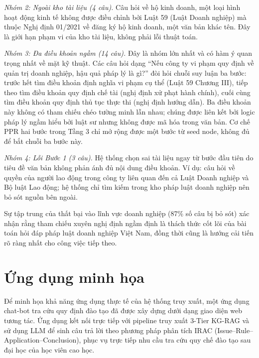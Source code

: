 \textit{Nhóm 2: Ngoài kho tài liệu (4 câu).} Câu hỏi về hộ kinh doanh, một loại hình
hoạt động kinh tế không được điều chỉnh bởi Luật 59 (Luật Doanh nghiệp) mà thuộc
Nghị định 01/2021 về đăng ký hộ kinh doanh, một văn bản khác tên. Đây là giới hạn
phạm vi của kho tài liệu, không phải lỗi thuật toán.

\textit{Nhóm 3: Đa điều khoản ngầm (14 câu).} Đây là nhóm lớn nhất và có hàm ý
quan trọng nhất về mặt kỹ thuật. Các câu hỏi dạng ``Nếu công ty vi phạm quy định về
quản trị doanh nghiệp, hậu quả pháp lý là gì?'' đòi hỏi chuỗi suy luận ba bước: trước hết tìm
điều khoản định nghĩa vi phạm cụ thể (Luật 59 Chương III), tiếp theo tìm điều khoản quy định
chế tài (nghị định xử phạt hành chính), cuối cùng tìm điều khoản quy định thủ tục thực thi
(nghị định hướng dẫn). Ba điều khoản này không có tham chiếu chéo tường minh lẫn
nhau; chúng được liên kết bởi logic pháp lý ngầm hiểu bởi luật sư nhưng không
được mã hóa trong văn bản. Cơ chế PPR hai bước trong Tầng 3 chỉ mở rộng được một
bước từ seed node, không đủ để bắt chuỗi ba bước này.

\textit{Nhóm 4: Lỗi Bước 1 (3 câu).} Hệ thống chọn sai tài liệu ngay từ bước đầu tiên
do tiêu đề văn bản không phản ánh đủ nội dung điều khoản. Ví dụ: câu hỏi về quyền
của người lao động trong công ty liên quan đến cả Luật Doanh nghiệp và Bộ luật Lao
động; hệ thống chỉ tìm kiếm trong kho pháp luật doanh nghiệp nên bỏ sót nguồn bên ngoài.

Sự tập trung của thất bại vào lĩnh vực doanh nghiệp (87\% số câu bị bỏ sót) xác nhận
rằng tham chiếu xuyên nghị định ngầm định là thách thức cốt lõi của bài toán hỏi đáp
pháp luật doanh nghiệp Việt Nam, đồng thời cũng là hướng cải tiến rõ ràng nhất cho công
việc tiếp theo.

\section{Ứng dụng minh họa}
\label{sec:ung-dung-minh-hoa}

Để minh họa khả năng ứng dụng thực tế của hệ thống truy xuất, một ứng dụng chat-bot tra cứu quy định đào tạo đã được xây dựng dưới dạng giao diện web tương tác. Ứng dụng kết nối trực tiếp với pipeline truy xuất 3-Tier KG-RAG và sử dụng LLM để sinh câu trả lời theo phương pháp phân tích IRAC (Issue--Rule--Application--Conclusion), phục vụ trực tiếp nhu cầu tra cứu quy chế đào tạo sau đại học của học viên cao học.

